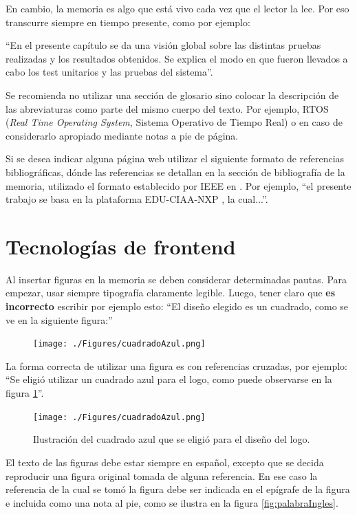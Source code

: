 En cambio, la memoria es algo que está vivo cada vez que el lector la lee. Por eso transcurre siempre en tiempo presente, como por ejemplo:

``En el presente capítulo se da una visión global sobre las distintas pruebas realizadas y los resultados obtenidos. Se explica el modo en que fueron llevados a cabo los test unitarios y las pruebas del sistema''.

Se recomienda no utilizar una sección de glosario sino colocar la descripción de las abreviaturas como parte del mismo cuerpo del texto. Por ejemplo, RTOS (\textit{Real Time Operating System}, Sistema Operativo de Tiempo Real) o en caso de considerarlo apropiado mediante notas a pie de página.

Si se desea indicar alguna página web utilizar el siguiente formato de referencias bibliográficas, dónde las referencias se detallan en la sección de bibliografía de la memoria, utilizado el formato establecido por IEEE en \citep{IEEE:citation}. Por ejemplo, ``el presente trabajo se basa en la plataforma EDU-CIAA-NXP \citep{CIAA}, la cual...''.

\section{Tecnologías de frontend} 

Al insertar figuras en la memoria se deben considerar determinadas pautas. Para empezar, usar siempre tipografía claramente legible. Luego, tener claro que \textbf{es incorrecto} escribir por ejemplo esto: ``El diseño elegido es un cuadrado, como se ve en la siguiente figura:''

\begin{figure}[h]
\centering
\texttt{[image: ./Figures/cuadradoAzul.png]}
\end{figure}

La forma correcta de utilizar una figura es con referencias cruzadas, por ejemplo: ``Se eligió utilizar un cuadrado azul para el logo, como puede observarse en la figura \ref{fig:cuadradoAzul}''.

\begin{figure}[ht]
	\centering
	\texttt{[image: ./Figures/cuadradoAzul.png]}
	\caption{Ilustración del cuadrado azul que se eligió para el diseño del logo.}
	\label{fig:cuadradoAzul}
\end{figure}

El texto de las figuras debe estar siempre en español, excepto que se decida reproducir una figura original tomada de alguna referencia. En ese caso la referencia de la cual se tomó la figura debe ser indicada en el epígrafe de la figura e incluida como una nota al pie, como se ilustra en la figura \ref{fig:palabraIngles}.

